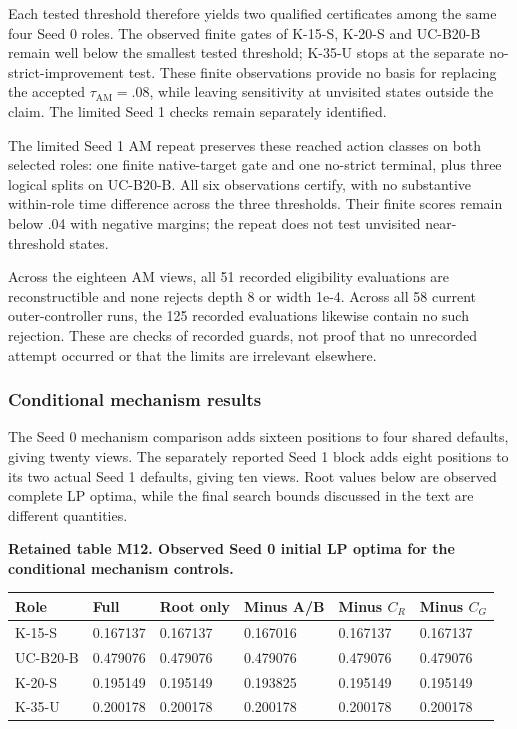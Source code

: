 \documentclass[
  american,
  11pt,
]{article}
\newcounter{none} %
\begin{document}
Each tested threshold therefore yields two qualified certificates among
the same four Seed 0 roles. The observed finite gates of K-15-S, K-20-S
and UC-B20-B remain well below the smallest tested threshold; K-35-U
stops at the separate no-strict-improvement test. These finite
observations provide no basis for replacing the accepted
\(\tau_{\mathrm{AM}}=.08\), while leaving sensitivity at unvisited
states outside the claim. The limited Seed 1 checks remain separately
identified.

The limited Seed 1 AM repeat preserves these reached action classes on
both selected roles: one finite native-target gate and one no-strict
terminal, plus three logical splits on UC-B20-B. All six observations
certify, with no substantive within-role time difference across the
three thresholds. Their finite scores remain below .04 with negative
margins; the repeat does not test unvisited near-threshold states.

Across the eighteen AM views, all 51 recorded eligibility evaluations
are reconstructible and none rejects depth 8 or width 1e-4. Across all
58 current outer-controller runs, the 125 recorded evaluations likewise
contain no such rejection. These are checks of recorded guards, not
proof that no unrecorded attempt occurred or that the limits are
irrelevant elsewhere.

\subsubsection{Conditional mechanism
results}\label{conditional-mechanism-results}

The Seed 0 mechanism comparison adds sixteen positions to four shared
defaults, giving twenty views. The separately reported Seed 1 block adds
eight positions to its two actual Seed 1 defaults, giving ten views.
Root values below are observed complete LP optima, while the final
search bounds discussed in the text are different quantities.

\Needspace{182pt}

\textbf{Retained table M12. Observed Seed 0 initial LP optima for the
conditional mechanism controls.}

{\def\LTcaptype{none} %
\begin{longtable}[]{@{}llllll@{}}
\toprule\noalign{}
Role & Full & Root only & Minus A/B & Minus \(C_R\) & Minus \(C_G\) \\
\midrule\noalign{}
\endhead
\bottomrule\noalign{}
\endlastfoot
K-15-S & 0.167137 & 0.167137 & 0.167016 & 0.167137 & 0.167137 \\
UC-B20-B & 0.479076 & 0.479076 & 0.479076 & 0.479076 & 0.479076 \\
K-20-S & 0.195149 & 0.195149 & 0.193825 & 0.195149 & 0.195149 \\
K-35-U & 0.200178 & 0.200178 & 0.200178 & 0.200178 & 0.200178 \\
\end{longtable}
}
\end{document}

